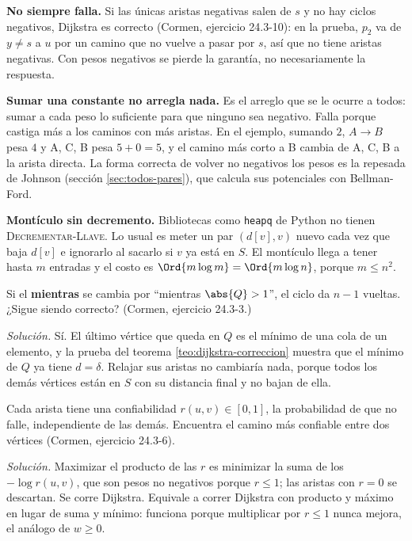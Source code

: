 \documentclass[11pt,letterpaper]{article}
\begin{document}
\begin{ojo}
  \textbf{No siempre falla.} Si las únicas aristas negativas salen de
  $s$ y no hay ciclos negativos, Dijkstra es correcto (Cormen,
  ejercicio 24.3-10): en la prueba, $p_2$ va de $y \neq s$ a $u$ por
  un camino que no vuelve a pasar por $s$, así que no tiene aristas
  negativas. Con pesos negativos se pierde la garantía, no
  necesariamente la respuesta.

  \smallskip
  \textbf{Sumar una constante no arregla nada.} Es el arreglo que se
  le ocurre a todos: sumar a cada peso lo suficiente para que ninguno
  sea negativo. Falla porque castiga más a los caminos con más
  aristas. En el ejemplo, sumando $2$, $A \to B$ pesa $4$ y A, C, B
  pesa $5 + 0 = 5$, y el camino más corto a B cambia de A, C, B a la
  arista directa. La forma correcta de volver no negativos los pesos
  es la repesada de Johnson (sección \ref{sec:todos-pares}), que
  calcula sus potenciales con Bellman-Ford.

  \smallskip
  \textbf{Montículo sin decremento.} Bibliotecas como \texttt{heapq}
  de Python no tienen \textsc{Decrementar-Llave}. Lo usual es meter un
  par $(d[v], v)$ nuevo cada vez que baja $d[v]$ e ignorarlo al
  sacarlo si $v$ ya está en $S$. El montículo llega a tener hasta $m$
  entradas y el costo es $\Ord{m \log m} = \Ord{m \log n}$, porque
  $m \le n^2$.
\end{ojo}

\begin{ejercicio}
  Si el \textbf{mientras} se cambia por ``mientras $\abs{Q} > 1$'', el
  ciclo da $n - 1$ vueltas. ¿Sigue siendo correcto? (Cormen,
  ejercicio 24.3-3.)

  \textit{Solución.} Sí. El último vértice que queda en $Q$ es el
  mínimo de una cola de un elemento, y la prueba del teorema
  \ref{teo:dijkstra-correccion} muestra que el mínimo de $Q$ ya tiene
  $d = \delta$. Relajar sus aristas no cambiaría nada, porque todos
  los demás vértices están en $S$ con su distancia final y no bajan de
  ella.
\end{ejercicio}

\begin{ejercicio}
  Cada arista tiene una confiabilidad $r(u, v) \in [0, 1]$, la
  probabilidad de que no falle, independiente de las demás. Encuentra
  el camino más confiable entre dos vértices (Cormen, ejercicio
  24.3-6).

  \textit{Solución.} Maximizar el producto de las $r$ es minimizar la
  suma de los $-\log r(u, v)$, que son pesos no negativos porque
  $r \le 1$; las aristas con $r = 0$ se descartan. Se corre Dijkstra.
  Equivale a correr Dijkstra con producto y máximo en lugar de suma y
  mínimo: funciona porque multiplicar por $r \le 1$ nunca mejora, el
  análogo de $w \ge 0$.
\end{ejercicio}
\end{document}

